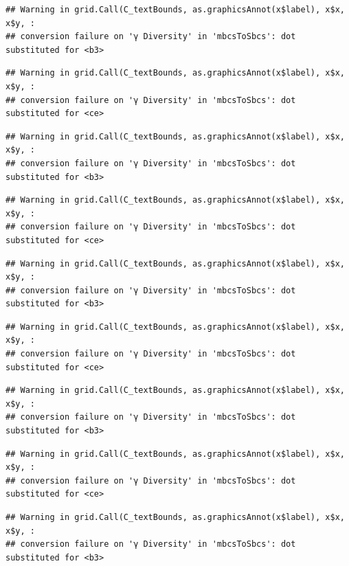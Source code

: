 \documentclass[
]{article}
\begin{document}
\begin{verbatim}
## Warning in grid.Call(C_textBounds, as.graphicsAnnot(x$label), x$x, x$y, :
## conversion failure on 'γ Diversity' in 'mbcsToSbcs': dot substituted for <b3>
\end{verbatim}

\begin{verbatim}
## Warning in grid.Call(C_textBounds, as.graphicsAnnot(x$label), x$x, x$y, :
## conversion failure on 'γ Diversity' in 'mbcsToSbcs': dot substituted for <ce>
\end{verbatim}

\begin{verbatim}
## Warning in grid.Call(C_textBounds, as.graphicsAnnot(x$label), x$x, x$y, :
## conversion failure on 'γ Diversity' in 'mbcsToSbcs': dot substituted for <b3>
\end{verbatim}

\begin{verbatim}
## Warning in grid.Call(C_textBounds, as.graphicsAnnot(x$label), x$x, x$y, :
## conversion failure on 'γ Diversity' in 'mbcsToSbcs': dot substituted for <ce>
\end{verbatim}

\begin{verbatim}
## Warning in grid.Call(C_textBounds, as.graphicsAnnot(x$label), x$x, x$y, :
## conversion failure on 'γ Diversity' in 'mbcsToSbcs': dot substituted for <b3>
\end{verbatim}

\begin{verbatim}
## Warning in grid.Call(C_textBounds, as.graphicsAnnot(x$label), x$x, x$y, :
## conversion failure on 'γ Diversity' in 'mbcsToSbcs': dot substituted for <ce>
\end{verbatim}

\begin{verbatim}
## Warning in grid.Call(C_textBounds, as.graphicsAnnot(x$label), x$x, x$y, :
## conversion failure on 'γ Diversity' in 'mbcsToSbcs': dot substituted for <b3>
\end{verbatim}

\begin{verbatim}
## Warning in grid.Call(C_textBounds, as.graphicsAnnot(x$label), x$x, x$y, :
## conversion failure on 'γ Diversity' in 'mbcsToSbcs': dot substituted for <ce>
\end{verbatim}

\begin{verbatim}
## Warning in grid.Call(C_textBounds, as.graphicsAnnot(x$label), x$x, x$y, :
## conversion failure on 'γ Diversity' in 'mbcsToSbcs': dot substituted for <b3>
\end{verbatim}
\end{document}

